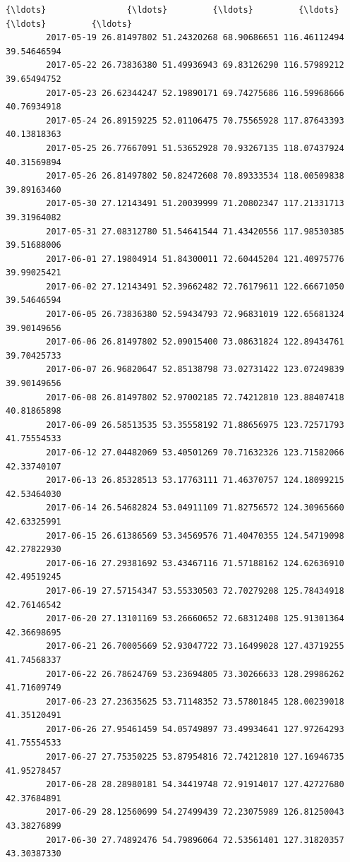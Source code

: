 \documentclass[11pt]{article}
\begin{document}
\begin{Verbatim}[commandchars=\\\{\}]
        {\ldots}                {\ldots}         {\ldots}         {\ldots}          {\ldots}         {\ldots}   
        2017-05-19 26.81497802 51.24320268 68.90686651 116.46112494 39.54646594   
        2017-05-22 26.73836380 51.49936943 69.83126290 116.57989212 39.65494752   
        2017-05-23 26.62344247 52.19890171 69.74275686 116.59968666 40.76934918   
        2017-05-24 26.89159225 52.01106475 70.75565928 117.87643393 40.13818363   
        2017-05-25 26.77667091 51.53652928 70.93267135 118.07437924 40.31569894   
        2017-05-26 26.81497802 50.82472608 70.89333534 118.00509838 39.89163460   
        2017-05-30 27.12143491 51.20039999 71.20802347 117.21331713 39.31964082   
        2017-05-31 27.08312780 51.54641544 71.43420556 117.98530385 39.51688006   
        2017-06-01 27.19804914 51.84300011 72.60445204 121.40975776 39.99025421   
        2017-06-02 27.12143491 52.39662482 72.76179611 122.66671050 39.54646594   
        2017-06-05 26.73836380 52.59434793 72.96831019 122.65681324 39.90149656   
        2017-06-06 26.81497802 52.09015400 73.08631824 122.89434761 39.70425733   
        2017-06-07 26.96820647 52.85138798 73.02731422 123.07249839 39.90149656   
        2017-06-08 26.81497802 52.97002185 72.74212810 123.88407418 40.81865898   
        2017-06-09 26.58513535 53.35558192 71.88656975 123.72571793 41.75554533   
        2017-06-12 27.04482069 53.40501269 70.71632326 123.71582066 42.33740107   
        2017-06-13 26.85328513 53.17763111 71.46370757 124.18099215 42.53464030   
        2017-06-14 26.54682824 53.04911109 71.82756572 124.30965660 42.63325991   
        2017-06-15 26.61386569 53.34569576 71.40470355 124.54719098 42.27822930   
        2017-06-16 27.29381692 53.43467116 71.57188162 124.62636910 42.49519245   
        2017-06-19 27.57154347 53.55330503 72.70279208 125.78434918 42.76146542   
        2017-06-20 27.13101169 53.26660652 72.68312408 125.91301364 42.36698695   
        2017-06-21 26.70005669 52.93047722 73.16499028 127.43719255 41.74568337   
        2017-06-22 26.78624769 53.23694805 73.30266633 128.29986262 41.71609749   
        2017-06-23 27.23635625 53.71148352 73.57801845 128.00239018 41.35120491   
        2017-06-26 27.95461459 54.05749897 73.49934641 127.97264293 41.75554533   
        2017-06-27 27.75350225 53.87954816 72.74212810 127.16946735 41.95278457   
        2017-06-28 28.28980181 54.34419748 72.91914017 127.42727680 42.37684891   
        2017-06-29 28.12560699 54.27499439 72.23075989 126.81250043 43.38276899   
        2017-06-30 27.74892476 54.79896064 72.53561401 127.31820357 43.30387330   
        

\end{Verbatim}
\end{document}
